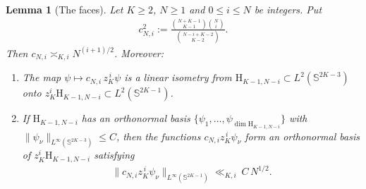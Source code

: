 \documentclass[a4paper,reqno,12pt]{amsart}
\theoremstyle{plain}
\newtheorem{lemma}[theorem]{Lemma}
\theoremstyle{plain}
\theoremstyle{remark}
\theoremstyle{plain}
\renewcommand{\H}{\mathrm{H}}
\newcommand{\Sphere}{\mathbb{S}}
\theoremstyle{plain}
\theoremstyle{plain}
\begin{document}
{\begin{lemma}[The faces]\label{lem:facenorm}
{Let $K\ge2$, $N\ge1$ and $0\le i\le N$ be integers.} Put 
\begin{align}
c_{N,i}^2
:=\frac{\binom{N+K-1}{K-1}\binom Ni}
{\binom{N-i+K-2}{K-2}}.
\label{eq:facenorm}
\end{align}
Then  $c_{N,i}\asymp_{K,i} N^{(i+1)/2}$.
Moreover:
\begin{enumerate}
\item The map $\psi\mapsto c_{N,i}\,z_K^{\,i}\psi$ is a linear isometry
from ${\H_{K-1,N-i}} \subset  L^2(\Sphere^{2K-3})$ onto
$z_K^i \H_{K-1,N-i} \subset L^2(\Sphere^{2K-1})${.}
\item If ${\H_{K-1,N-i}}$ has an orthonormal basis
$\{\psi_1,{\ldots},\psi_{{\dim\H_{K-1,N-i}}}\}$ with
$\|\psi_\nu\|_{L^\infty(\Sphere^{2K-3})}\le C$, then the functions
$c_{N,i}z_K^{\,i}\psi_\nu$ form an orthonormal basis of $z_K^i \H_{K-1,N-i}$ satisfying
\begin{align}
\bigl\|c_{N,i}z_K^{\,i}\psi_\nu\bigr\|_{L^\infty(\Sphere^{2K-1})}
 \ll_{K,i}\ C\,N^{1/2}.
\label{eq:facesup}
\end{align}
\end{enumerate}
\end{lemma}

}
\end{document}
